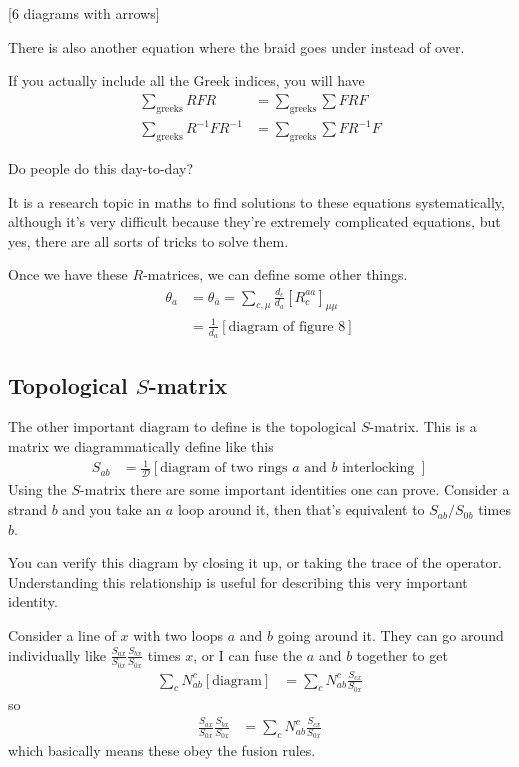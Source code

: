 [6 diagrams with arrows]

There is also another equation where the braid goes under instead of over.

If you actually include all the Greek indices, you will have
\begin{align}
    \sum_{\text{greeks}} RFR
    &=
    \sum_{\text{greeks}} \sum FRF\\
    \sum_{\text{greeks}} R^{-1}FR^{-1}
    &=
    \sum_{\text{greeks}} \sum FR^{-1}F
\end{align}

\begin{question}
    Do people do this day-to-day?
\end{question}
It is a research topic in maths to find solutions to these equations
systematically,
although it's very difficult because they're extremely complicated equations,
but yes,
there are all sorts of tricks to solve them.

Once we have these $R$-matrices,
we can define some other things.
\begin{align}
    \theta_a
    &=
    \theta_{\bar{a}}
    =
    \sum_{c,\mu}
    \frac{d_c}{d_a}
    \left[ R_c^{aa} \right]_{\mu\mu}\\
    &=
    \frac{1}{d_a}
    \left[ \text{diagram of figure 8}\right]
\end{align}

\subsection{Topological $S$-matrix}
The other important diagram to define is the topological $S$-matrix.
This is a matrix we diagrammatically define like this
\begin{align}
    S_{ab} &=
    \frac{1}{\mathcal{D}}
    \left[ \text{diagram of two rings $a$ and $b$ interlocking }\right]
\end{align}
Using the $S$-matrix there are some important identities one can prove.
Consider a strand $b$ and you take an $a$ loop around it,
then that's equivalent to $S_{ab}/S_{0b}$ times $b$.

You can verify this diagram by closing it up,
or taking the trace of the operator.
Understanding this relationship is useful for describing this very important
identity.

Consider a line of $x$ with two loops $a$ and $b$ going around it.
They can go around individually like
$\frac{S_{ax}}{S_{0x}} \frac{S_{bx}}{S_{0x}}$
times $x$,
or I can fuse the $a$ and $b$ together to get
\begin{align}
    \sum_{c} N_{ab}^c [\text{diagram}]
    &=
    \sum_c N_{ab}^c \frac{S_{cx}}{S_{0x}}
\end{align}
so
\begin{align}
    \frac{S_{ax}}{S_{0x}}
    \frac{S_{bx}}{S_{0x}}
    &=
    \sum_{c}
    N_{ab}^{c}
    \frac{S_{cx}}{S_{0x}}
\end{align}
which basically means these obey the fusion rules.

